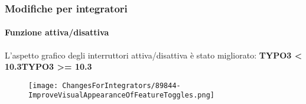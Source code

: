 
\begin{frame}[fragile]
	\frametitle{Modifiche per integratori}
	\framesubtitle{Funzione attiva/disattiva}

	L'aspetto grafico degli interruttori attiva/disattiva è stato migliorato:
	\newline\newline
	\smaller\textbf{TYPO3 < 10.3}\tabto{6cm}\textbf{TYPO3 >= 10.3}\normalsize

	\begin{figure}
		\texttt{[image: ChangesForIntegrators/89844-ImproveVisualAppearanceOfFeatureToggles.png]}
	\end{figure}

\end{frame}

%
%
%
%
%
%
%
